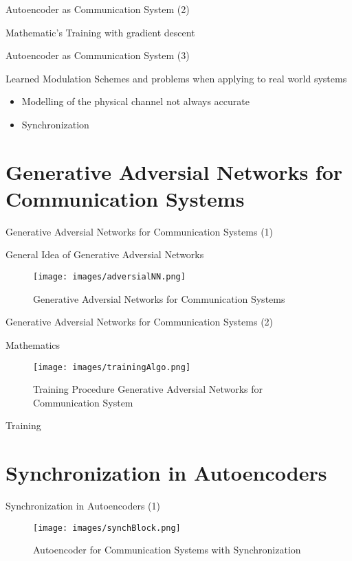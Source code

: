 \documentclass[xcolor=table,mathserif,9pt]{beamer}    %
\begin{document}
\begin{frame}{Autoencoder as Communication System (2)}

Mathematic's
Training with gradient descent

\end{frame}

\begin{frame}{Autoencoder as Communication System (3)}

Learned Modulation Schemes and problems when applying to real world systems
\begin{itemize}
	\item Modelling of the physical channel not always accurate
	\item Synchronization
\end{itemize}


\end{frame}

\section{Generative Adversial Networks for Communication Systems}
\begin{frame}{Generative Adversial Networks for Communication Systems (1)}

General Idea of Generative Adversial Networks
\begin{figure}[htpb]
	\centering
	\texttt{[image: images/adversialNN.png]}
	\caption{Generative Adversial Networks for Communication Systems}
\end{figure}

\end{frame}

\begin{frame}{Generative Adversial Networks for Communication Systems (2)}

Mathematics
\begin{figure}[htpb]
	\centering
	\texttt{[image: images/trainingAlgo.png]}
	\caption{Training Procedure Generative Adversial Networks for Communication System}
\end{figure}
Training

\end{frame}

\section{Synchronization in Autoencoders}
\begin{frame}{Synchronization in Autoencoders (1)}

\begin{figure}[htpb]
	\centering
	\texttt{[image: images/synchBlock.png]}
	\caption{Autoencoder for Communication Systems with Synchronization}
\end{figure}
\end{frame}
\end{document}
